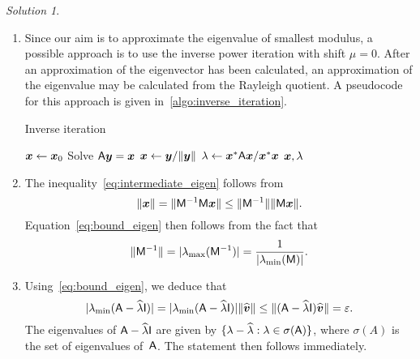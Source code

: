 \documentclass[11pt]{article}
\theoremstyle{definition}
\theoremstyle{remark}
\newtheorem*{solution}{Solution}
\begin{document}
\begin{solution}
    $~$
    \begin{enumerate}
        \item
            Since our aim is to approximate the eigenvalue of smallest modulus,
            a possible approach is to use the inverse power iteration with shift $\mu = 0$.
            After an approximation of the eigenvector has been calculated,
            an approximation of the eigenvalue may be calculated from the Rayleigh quotient.
            A pseudocode for this approach is given in~\cref{algo:inverse_iteration}.
            \begin{algorithm}
                \caption{Inverse iteration}%
                \label{algo:inverse_iteration}%
                \begin{algorithmic}
                    \State $\mathbf{\boldsymbol{x}} \gets \mathbf{\boldsymbol{x}}_0$
                    \State Solve $\mathsf A \mathbf{\boldsymbol{y}} = \mathbf{\boldsymbol{x}}$
                    \State $\mathbf{\boldsymbol{x}} \gets \mathbf{\boldsymbol{y}} / \lVert\mathbf{\boldsymbol{y}}\rVert$
                    \EndFor
                    \State $\lambda \gets \mathbf{\boldsymbol{x}}^* \mathsf A \mathbf{\boldsymbol{x}} / \mathbf{\boldsymbol{x}}^* \mathbf{\boldsymbol{x}}$
                    \State \Return $\mathbf{\boldsymbol{x}}, \lambda$
                \end{algorithmic}
            \end{algorithm}

        \item
            The inequality~\eqref{eq:intermediate_eigen} follows from
            \[
                \lVert\mathbf{\boldsymbol{x}}\rVert = \lVert\mathsf M^{-1} \mathsf M \mathbf{\boldsymbol{x}}\rVert \leq \lVert\mathsf M^{-1}\rVert \lVert\mathsf M \mathbf{\boldsymbol{x}}\rVert.
            \]
            Equation~\eqref{eq:bound_eigen} then follows from the fact that
            \begin{equation}
                \label{eq:norm_inverse}
                \lVert\mathsf M^{-1}\rVert = \lvert\lambda_{\max}(\mathsf M^{-1})\rvert = \frac{1}{\lvert\lambda_{\min}(\mathsf M)\rvert}.
            \end{equation}

        \item
            Using~\eqref{eq:bound_eigen},
            we deduce that
            \[
                \lvert\lambda_{\min}(\mathsf A - \widehat \lambda \mathsf I)\rvert =
                \lvert\lambda_{\min}(\mathsf A - \widehat \lambda \mathsf I)\rvert \lVert\widehat {\mathbf{\boldsymbol{v}}}\rVert
                \leq \lVert(\mathsf A - \widehat \lambda \mathsf I) \widehat {\mathbf{\boldsymbol{v}}}\rVert = \varepsilon.
            \]
            The eigenvalues of $\mathsf A - \widehat \lambda \mathsf I$ are given by $\{\lambda - \widehat \lambda : \lambda \in \sigma(\mathsf A)\}$,
            where $\sigma(A)$ is the set of eigenvalues of~$\mathsf A$.
            The statement then follows immediately.


\end{enumerate}
\end{solution}
\end{document}
